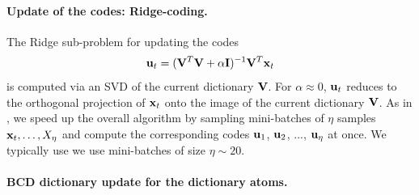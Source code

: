 \paragraph*{Update of the codes: Ridge-coding.}
The Ridge sub-problem for updating the codes%
\begin{equation}
  \mathbf{u}_t = (\mathbf{V}^T\mathbf{V} + \alpha \mathbf{I})^{-1}\mathbf{V}^T\mathbf{x}_t
  \label{eq:code}
\end{equation}
is computed via an SVD of the current dictionary $\mathbf{V}$.
For $\alpha \approx 0$, $\mathbf{u}_t$
reduces to the orthogonal projection of $\mathbf{x}_t$ onto the image of the current
dictionary $\mathbf{V}$.
As in  \cite{mairal2010}, we speed up the overall algorithm by sampling mini-batches of $\eta$ samples $\mathbf{x}_t,\ldots,X_\eta$ and compute the corresponding codes $\mathbf{u}_1$, $\mathbf{u}_2$, ..., $\mathbf{u}_\eta$ at once. We typically use we use mini-batches of size $\eta \sim 20$.

\paragraph*{BCD dictionary update for the dictionary atoms.}

